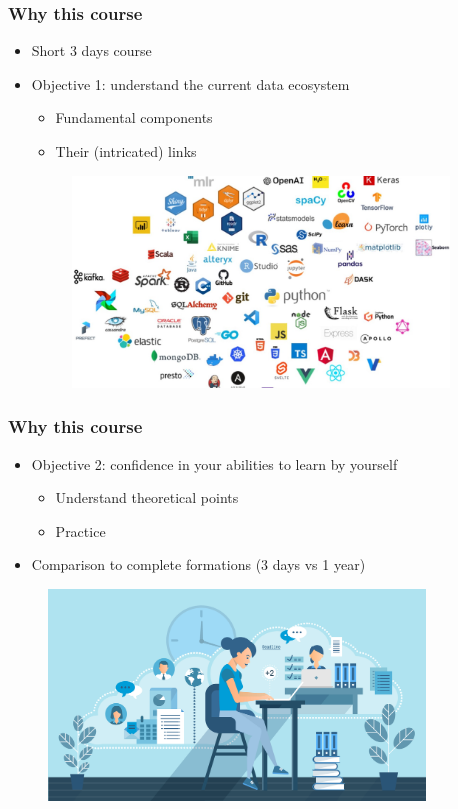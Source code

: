 \begin{frame}\frametitle{Why this course}
   \begin{itemize}
      \item Short 3 days course 
      \item Objective 1: understand the current data ecosystem
      \begin{itemize}
         \item Fundamental components
         \item Their (intricated) links
      \end{itemize}
      \begin{figure}[H]
         \includegraphics[width=10cm]{../images/illustrations/data_ecosystem.png}
      \end{figure}
   \end{itemize}
\end{frame}


\begin{frame}\frametitle{Why this course}
   \begin{itemize}
      \item Objective 2: confidence in your abilities to learn by yourself
      \begin{itemize}
         \item Understand theoretical points
         \item Practice
      \end{itemize}
      \item Comparison to complete formations (3 days vs 1 year)
   \end{itemize}

   \begin{figure}[H]
      \includegraphics[width=10cm]{../images/illustrations/learn_autonomous.jpeg}
   \end{figure}

\end{frame}


